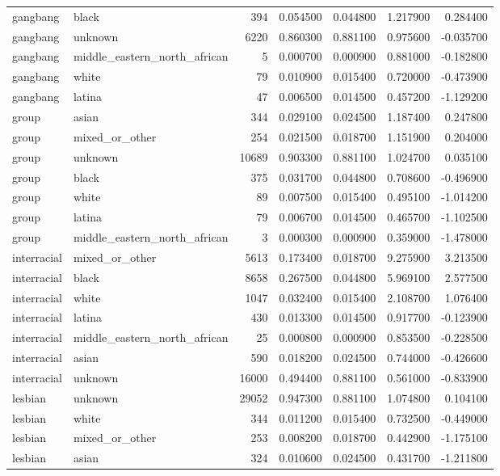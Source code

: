 \begin{tabular}{llrrrrr}
gangbang & black & 394 & 0.054500 & 0.044800 & 1.217900 & 0.284400 \\
gangbang & unknown & 6220 & 0.860300 & 0.881100 & 0.975600 & -0.035700 \\
gangbang & middle_eastern_north_african & 5 & 0.000700 & 0.000900 & 0.881000 & -0.182800 \\
gangbang & white & 79 & 0.010900 & 0.015400 & 0.720000 & -0.473900 \\
gangbang & latina & 47 & 0.006500 & 0.014500 & 0.457200 & -1.129200 \\
group & asian & 344 & 0.029100 & 0.024500 & 1.187400 & 0.247800 \\
group & mixed_or_other & 254 & 0.021500 & 0.018700 & 1.151900 & 0.204000 \\
group & unknown & 10689 & 0.903300 & 0.881100 & 1.024700 & 0.035100 \\
group & black & 375 & 0.031700 & 0.044800 & 0.708600 & -0.496900 \\
group & white & 89 & 0.007500 & 0.015400 & 0.495100 & -1.014200 \\
group & latina & 79 & 0.006700 & 0.014500 & 0.465700 & -1.102500 \\
group & middle_eastern_north_african & 3 & 0.000300 & 0.000900 & 0.359000 & -1.478000 \\
interracial & mixed_or_other & 5613 & 0.173400 & 0.018700 & 9.275900 & 3.213500 \\
interracial & black & 8658 & 0.267500 & 0.044800 & 5.969100 & 2.577500 \\
interracial & white & 1047 & 0.032400 & 0.015400 & 2.108700 & 1.076400 \\
interracial & latina & 430 & 0.013300 & 0.014500 & 0.917700 & -0.123900 \\
interracial & middle_eastern_north_african & 25 & 0.000800 & 0.000900 & 0.853500 & -0.228500 \\
interracial & asian & 590 & 0.018200 & 0.024500 & 0.744000 & -0.426600 \\
interracial & unknown & 16000 & 0.494400 & 0.881100 & 0.561000 & -0.833900 \\
lesbian & unknown & 29052 & 0.947300 & 0.881100 & 1.074800 & 0.104100 \\
lesbian & white & 344 & 0.011200 & 0.015400 & 0.732500 & -0.449000 \\
lesbian & mixed_or_other & 253 & 0.008200 & 0.018700 & 0.442900 & -1.175100 \\
lesbian & asian & 324 & 0.010600 & 0.024500 & 0.431700 & -1.211800 \\

\end{tabular}
